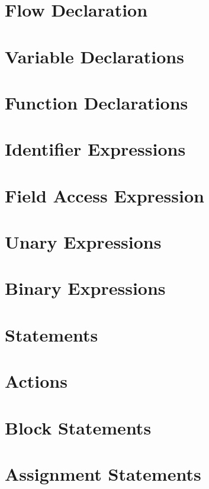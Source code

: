 \section{Flow Declaration} \label{flow_guide}

\section{Variable Declarations} \label{variable_guide}

\section{Function Declarations} \label{function_guide}

\section{Identifier Expressions} \label{id_expr_guide}

\section{Field Access Expression} \label{field_access_expr_guide}

\section{Unary Expressions} \label{unary_expr_guide}

\section{Binary Expressions} \label{binary_expr_guide}

\section{Statements} \label{statements_guide}

\section{Actions} \label{action_guide}

\section{Block Statements} \label{block_stmt_guide}

\section{Assignment Statements} \label{assign_stmt_guide}